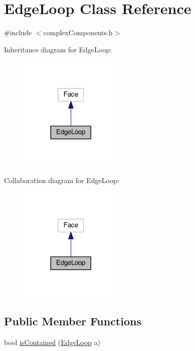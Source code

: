 \hypertarget{classEdgeLoop}{}\section{Edge\+Loop Class Reference}
\label{classEdgeLoop}


{\ttfamily \#include $<$complex\+Components.\+h$>$}



Inheritance diagram for Edge\+Loop\+:
\nopagebreak
\begin{figure}[H]
\begin{center}
\leavevmode
\includegraphics[width=140pt]{classEdgeLoop__inherit__graph}
\end{center}
\end{figure}


Collaboration diagram for Edge\+Loop\+:
\nopagebreak
\begin{figure}[H]
\begin{center}
\leavevmode
\includegraphics[width=140pt]{classEdgeLoop__coll__graph}
\end{center}
\end{figure}
\subsection*{Public Member Functions}
\begin{DoxyCompactItemize}
\item 
bool \hyperlink{classEdgeLoop_acae6f647805e3f043325f047208556c8}{is\+Contained} (\hyperlink{classEdgeLoop}{Edge\+Loop} a)
\end{DoxyCompactItemize}


